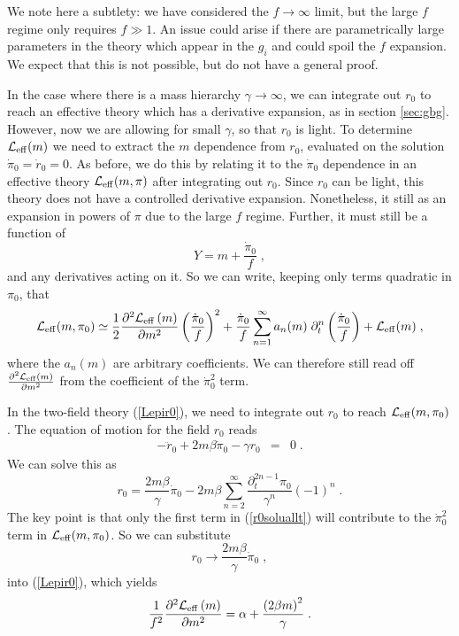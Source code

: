 \documentclass[11pt]{article}
\numberwithin{equation}{section}
\newcommand{\be}{\begin{equation}} \newcommand{\ee}{\end{equation}}
\newcommand{\bea}{\begin{eqnarray}}  \newcommand{\eea}{\end{eqnarray}}
\begin{document}
We note here a subtlety: we have considered the $f \rightarrow \infty$ limit, but the large $f$ regime only requires $f \gg 1$. An issue could arise if there are parametrically large parameters in the theory which appear in the $g_i$ and could spoil the $f$ expansion. We expect that this is not possible, but do not have a general proof. 

In the case where there is a mass hierarchy $\gamma \rightarrow \infty$, we can integrate out $r_0$ to reach an effective theory which has a derivative expansion, as in section \ref{sec:gbg}. However, now we are allowing for small $\gamma$, so that $r_0$ is light. To determine ${\cal L}_{\mathrm{eff}}(m)$ we need to extract the $m$ dependence from $r_0$, evaluated on the solution $\dot{\pi}_0=\dot{r}_0=0$. As before, we do this by relating it to the $\dot{\pi}_0$ dependence in an effective theory ${\cal L}_{\mathrm{eff}}(m,\pi)$ after integrating out $r_0$. Since $r_0$ can be light, this theory does not have a controlled derivative expansion. Nonetheless, it still as an expansion in powers of $\pi$ due to the large $f$ regime. Further, it must still be a function of 
\be
Y = m + \frac{\dot{\pi}_0}{f} \;,
\ee 
and any derivatives acting on it. So we can write, keeping only terms quadratic in $\pi_0$, that
\be
{\cal L}_{\mathrm{eff}}(m,\pi_0) \simeq \frac12 \frac{\partial^2{\cal L}_{\mathrm{eff}}\left(m\right)}{\partial m^2} \left(\frac{\dot{\pi}_0}{f} \right)^2 + \frac{\dot{\pi}_0}{f} \sum_{n=1}^{\infty} a_n(m)\;\partial_t^n \left(\frac{\dot{\pi}_0}{f} \right)  + {\cal L}_{\mathrm{eff}}(m)\;,
\ee
where the $a_n(m)$ are arbitrary coefficients. We can therefore still read off  $\frac{\partial^2{\cal L}_{\mathrm{eff}}\left(m\right)}{\partial m^2}$ from the coefficient of the $\dot{\pi}_0^2$ term. 

In the two-field theory (\ref{Lepir0}), we need to integrate out $r_0$ to reach ${\cal L}_{\mathrm{eff}}(m,\pi_0)$. The equation of motion for the field $r_0$ reads
\bea
-\ddot{r}_0 + 2m\beta \dot{\pi}_0 - \gamma r_0 &=& 0 \label{eqmr0} \;.
\eea
We can solve this as
\be
r_0 = \frac{2 m \beta }{\gamma} \dot{\pi}_0 -2 m \beta  \sum_{n=2}^{\infty} \frac{\partial_t^{2n-1}\pi_0}{\gamma^n} (-1)^n \;.
\label{r0soluallt}
\ee
The key point is that only the first term in (\ref{r0soluallt}) will contribute to the $\dot{\pi}_0^2$ term in ${\cal L}_{\mathrm{eff}}(m,\pi_0)$. So we can substitute 
\be
r_0 \rightarrow \frac{2 m \beta}{\gamma} \dot{\pi}_0 \;,
\ee
into (\ref{Lepir0}), which yields
\be
\frac{1}{f^2}\frac{\partial^2{\cal L}_{\mathrm{eff}}\left(m\right)}{\partial m^2} = \alpha + \frac{\left(2\beta m\right)^2}{ \gamma} \;.
\label{d2lmfgen}
\ee
\end{document}
